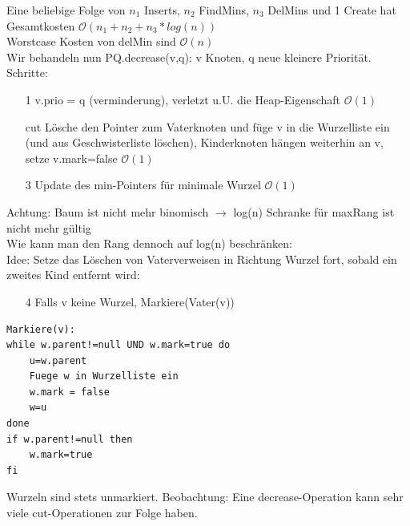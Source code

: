 \documentclass[a4paper]{article}
\newcommand{\oh}[1]{$\mathcal{O}(#1)$}
\begin{document}
Eine beliebige Folge von $n_1$ Inserts, $n_2$ FindMins, $n_3$ DelMins und 1 Create hat Gesamtkosten \oh{n_1+n_2+n_3*log(n)}\\
Worstcase Kosten von delMin sind \oh{n}\\
Wir behandeln nun PQ.decrease(v,q): v Knoten, q neue kleinere Priorität.\\
Schritte:\begin{enumerate}
\item[1] v.prio = q (verminderung), verletzt u.U. die Heap-Eigenschaft \oh{1}
\item[cut] Lösche den Pointer zum Vaterknoten und füge v in die Wurzelliste ein (und aus Geschwisterliste löschen), Kinderknoten hängen weiterhin an v, setze v.mark=false \oh{1}
\item[3] Update des min-Pointers für minimale Wurzel \oh{1}

\end{enumerate}
Achtung: Baum ist nicht mehr binomisch $\rightarrow$ log(n) Schranke für maxRang ist nicht mehr gültig\\
Wie kann man den Rang dennoch auf log(n) beschränken:\\
Idee: Setze das Löschen von Vaterverweisen in Richtung Wurzel fort, sobald ein zweites Kind entfernt wird:
\begin{enumerate}
\item[4] Falls v keine Wurzel, Markiere(Vater(v))
\end{enumerate}
\begin{lstlisting}
Markiere(v):
while w.parent!=null UND w.mark=true do
	u=w.parent
	Fuege w in Wurzelliste ein
	w.mark = false
	w=u
done
if w.parent!=null then
	w.mark=true
fi
\end{lstlisting}
Wurzeln sind stets unmarkiert.
Beobachtung: Eine decrease-Operation kann sehr viele cut-Operationen zur Folge haben.
\end{document}
